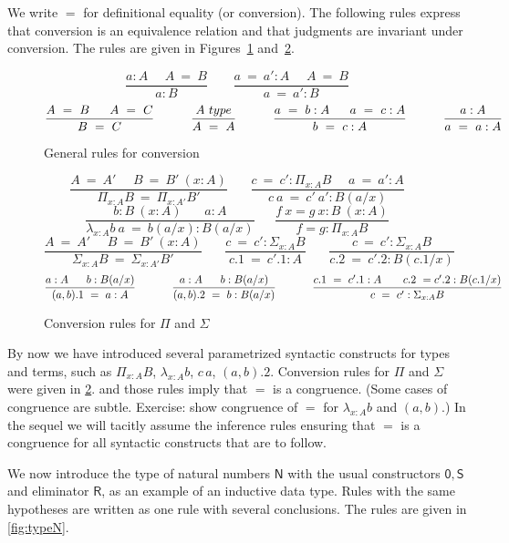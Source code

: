\documentclass[a4paper,UKenglish,cleveref, autoref, thm-restate]{lipics-v2021}
\newcommand{\conv}{=}
\newcommand{\NN}{\mathsf{N}}
\newcommand{\ZERO}{\mathsf{0}}
\newcommand{\SUCC}{\mathsf{S}}
\newcommand{\type}{\mathsf{type}}
\newcommand{\mylam}[3]{\lambda_{#1:#2}#3}
\newcommand{\mypi}[3]{\Pi_{#1:#2}#3}
\newcommand{\mysig}[3]{\Sigma_{#1:#2}#3}
\newcommand{\app}[2]{{#1\,#2}} %
\newcommand{\RR}{\mathsf{R}}
\begin{document}
We write $\conv$ for definitional equality (or conversion).
The following rules express that conversion is an equivalence
relation and that judgments are invariant under conversion.
The rules are given in Figures~\ref{fig:conversion} and~\ref{fig:convPiSig}.

\begin{figure}[h!]
$$
\frac{ a:A~~~~~~ A~ \conv~ B}{ a:B}~~~~~~~~~
\frac{ a ~\conv~a':A~~~~~~ A  ~\conv~ B}{ a ~\conv~a':B}
$$
$$
\frac{A~=~B~~~~~A~=~C}{B~=~C}~~~~~~~~~\frac{A~\type}{A~=~A}~~~~~~~~~
\frac{a~=~b:A~~~~~a~=~c:A}{b~=~c:A}~~~~~~~~~\frac{a:A}{a~=~a:A}
\belowdisplayshortskip 1pt
$$
  \caption{General rules for conversion}\label{fig:conversion}
\end{figure}

\begin{figure}[h!]
$$
\frac{A~=~A'~~~~~~B~=~B'~(x:A)}{\mypi{x}{A}{B}~=~\mypi{x}{A'}{B'}}~~~~~~~~
\frac{c~=~c':\mypi{x}{A}{B}~~~~~~a~=~a':A}{c~a~=~c'~a':B(a/x)}
$$
$$
\frac{b:B~(x:A)~~~~~~~~ a:A}{ \mylam{x}{A}{b}~a  ~\conv~ b(a/x):B(a/x)}
~~~~~~~
\frac{f~x = g~x:B~(x:A)}{ f = g : \mypi{x}{A}{B}}
$$
$$
\frac{A~=~A'~~~~~~B~=~B'~(x:A)}{\mysig{x}{A}{B}~=~\mysig{x}{A'}{B'}}~~~~~~~~
\frac{c~=~c':\mysig{x}{A}{B}}{c.1~=~c'.1:A}~~~~~~~~
\frac{c~=~c':\mysig{x}{A}{B}}{c.2~=~c'.2:B(c.1/x)}~~~~~~~~
$$
$$
\frac{a:A~~~~~b:B(a/x)}{ (a,b).1 ~\conv~ a:A}~~~~~~~~~~
\frac{a:A~~~~~b:B(a/x)}{ (a,b).2 ~\conv~ b:B(a/x)}~~~~~~~~~~
\frac{c.1~=~ c'.1:A~~~~~~c.2~=c'.2:B(c.1/x)}{ c~=~ c' : \mysig{x}{A}{B}}
\belowdisplayshortskip 0pt
$$
  \caption{Conversion rules for $\Pi$ and $\Sigma$}\label{fig:convPiSig}
\end{figure}

By now we have introduced several parametrized syntactic constructs
for types and terms, such as $\mypi{x}{A}{B}$,
$\mylam{x}{A}{b}$, $\app{c}{a}$, $(a,b).2$.
Conversion rules for $\Pi$ and $\Sigma$ were given in \cref{fig:convPiSig}.
and those rules imply that $=$ is a congruence.%
(Some cases of congruence are subtle. Exercise:
show congruence of $=$ for $\mylam{x}{A}{b}$ and $(a,b)$.)
In the sequel we will tacitly assume the inference rules
ensuring that $=$ is a congruence for all syntactic constructs
that are to follow.

We now introduce the type of natural numbers $\NN$ with
the usual constructors $\ZERO,\SUCC$ and eliminator $\RR$,
as an example of an inductive data type.
Rules with the same hypotheses are written as one rule with
several conclusions.
The rules are given in \cref{fig:typeN}.
\end{document}
